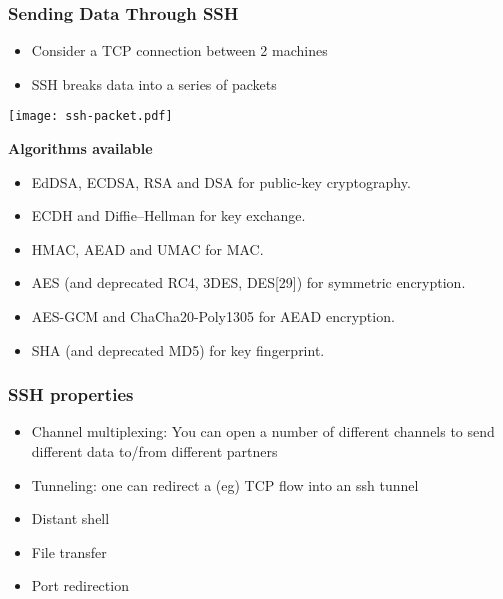 \documentclass[
hyperref={pdfpagelabels=false}
,xcolor=table
]
{beamer}
\begin{document}
\begin{frame}
  \frametitle{Sending Data Through SSH}
  \begin{itemize}
  \item Consider a TCP connection between 2 machines
  \item SSH breaks data into a series of packets
  \end{itemize}

  \begin{center}
    \texttt{[image: ssh-packet.pdf]}
  \end{center}

  {\scriptsize   \textbf{Algorithms available}
    \begin{itemize}
    \item EdDSA, ECDSA, RSA and DSA for public-key cryptography.
    \item ECDH and Diffie–Hellman for key exchange.
    \item HMAC, AEAD and UMAC for MAC.
    \item AES (and deprecated RC4, 3DES, DES[29]) for symmetric encryption.
    \item AES-GCM and ChaCha20-Poly1305 for AEAD encryption.
    \item SHA (and deprecated MD5) for key fingerprint.
    \end{itemize}
  }
\end{frame}

\begin{frame}
  \frametitle{SSH properties}
  \begin{itemize}
  \item Channel multiplexing: You can open a number of different channels to send different
    data to/from different partners
  \item Tunneling: one can redirect a (eg) TCP flow into an ssh tunnel 
  \item Distant shell
  \item File transfer
  \item Port redirection
  \end{itemize}
\end{frame}
\end{document}
